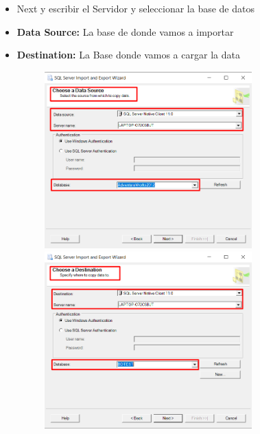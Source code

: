 \documentclass{article}
\begin{document}
\begin{itemize}
\begin{figure}[htb]
\begin{center}
		\end{center}
	\end{figure}

\newpage

\item Next y escribir el Servidor y seleccionar la base de datos
\item \textbf{Data Source:} La base de donde vamos a importar
\item \textbf{Destination:} La Base donde vamos a cargar la data
	\begin{figure}[htb]
		\begin{center}
			\includegraphics[width=8cm]{./images/Tarea1_3}
			\includegraphics[width=8cm]{./images/Tarea1_4}
		\end{center}
	\end{figure}


\end{itemize}
\end{document}
